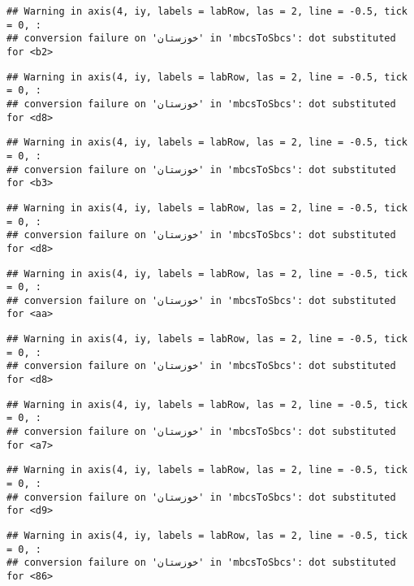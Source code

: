 \documentclass[
]{article}
\begin{document}
\begin{verbatim}
## Warning in axis(4, iy, labels = labRow, las = 2, line = -0.5, tick = 0, :
## conversion failure on 'خوزستان' in 'mbcsToSbcs': dot substituted for <b2>
\end{verbatim}

\begin{verbatim}
## Warning in axis(4, iy, labels = labRow, las = 2, line = -0.5, tick = 0, :
## conversion failure on 'خوزستان' in 'mbcsToSbcs': dot substituted for <d8>
\end{verbatim}

\begin{verbatim}
## Warning in axis(4, iy, labels = labRow, las = 2, line = -0.5, tick = 0, :
## conversion failure on 'خوزستان' in 'mbcsToSbcs': dot substituted for <b3>
\end{verbatim}

\begin{verbatim}
## Warning in axis(4, iy, labels = labRow, las = 2, line = -0.5, tick = 0, :
## conversion failure on 'خوزستان' in 'mbcsToSbcs': dot substituted for <d8>
\end{verbatim}

\begin{verbatim}
## Warning in axis(4, iy, labels = labRow, las = 2, line = -0.5, tick = 0, :
## conversion failure on 'خوزستان' in 'mbcsToSbcs': dot substituted for <aa>
\end{verbatim}

\begin{verbatim}
## Warning in axis(4, iy, labels = labRow, las = 2, line = -0.5, tick = 0, :
## conversion failure on 'خوزستان' in 'mbcsToSbcs': dot substituted for <d8>
\end{verbatim}

\begin{verbatim}
## Warning in axis(4, iy, labels = labRow, las = 2, line = -0.5, tick = 0, :
## conversion failure on 'خوزستان' in 'mbcsToSbcs': dot substituted for <a7>
\end{verbatim}

\begin{verbatim}
## Warning in axis(4, iy, labels = labRow, las = 2, line = -0.5, tick = 0, :
## conversion failure on 'خوزستان' in 'mbcsToSbcs': dot substituted for <d9>
\end{verbatim}

\begin{verbatim}
## Warning in axis(4, iy, labels = labRow, las = 2, line = -0.5, tick = 0, :
## conversion failure on 'خوزستان' in 'mbcsToSbcs': dot substituted for <86>
\end{verbatim}
\end{document}
